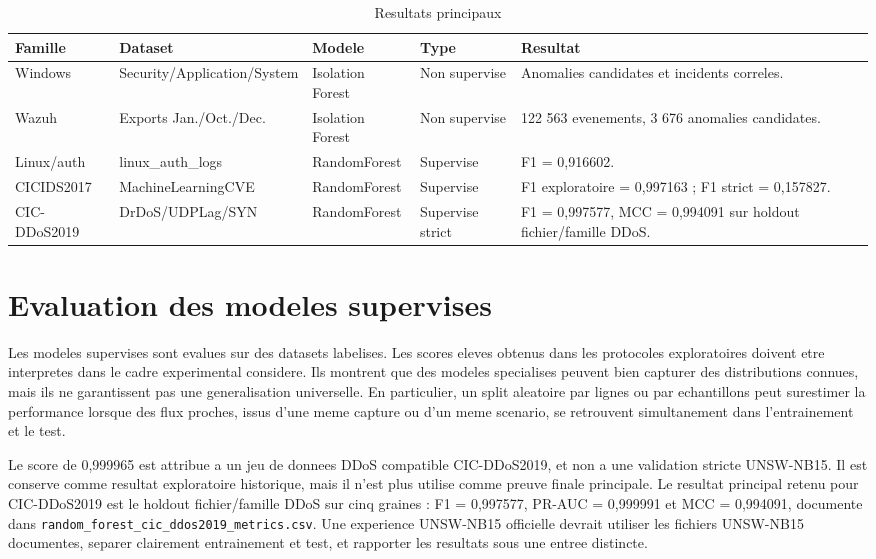 \begin{table}[H]
\centering
\caption{Resultats principaux}
\label{tab:main-results}
\scriptsize
\begin{tabularx}{\textwidth}{p{2.5cm}p{3cm}p{2.6cm}p{2.2cm}X}
\toprule
\textbf{Famille} & \textbf{Dataset} & \textbf{Modele} & \textbf{Type} & \textbf{Resultat} \\
\midrule
Windows & Security/Application/System & Isolation Forest & Non supervise & Anomalies candidates et incidents correles. \\
Wazuh & Exports Jan./Oct./Dec. & Isolation Forest & Non supervise & 122 563 evenements, 3 676 anomalies candidates. \\
Linux/auth & linux\_auth\_logs & RandomForest & Supervise & F1 = 0,916602. \\
CICIDS2017 & MachineLearningCVE & RandomForest & Supervise & F1 exploratoire = 0,997163 ; F1 strict = 0,157827. \\
CIC-DDoS2019 & DrDoS/UDPLag/SYN & RandomForest & Supervise strict & F1 = 0,997577, MCC = 0,994091 sur holdout fichier/famille DDoS. \\
\bottomrule
\end{tabularx}
\end{table}

\section{Evaluation des modeles supervises}
Les modeles supervises sont evalues sur des datasets labelises. Les scores eleves obtenus dans les protocoles exploratoires doivent etre interpretes dans le cadre experimental considere. Ils montrent que des modeles specialises peuvent bien capturer des distributions connues, mais ils ne garantissent pas une generalisation universelle. En particulier, un split aleatoire par lignes ou par echantillons peut surestimer la performance lorsque des flux proches, issus d'une meme capture ou d'un meme scenario, se retrouvent simultanement dans l'entrainement et le test.

Le score de 0,999965 est attribue a un jeu de donnees DDoS compatible CIC-DDoS2019, et non a une validation stricte UNSW-NB15. Il est conserve comme resultat exploratoire historique, mais il n'est plus utilise comme preuve finale principale. Le resultat principal retenu pour CIC-DDoS2019 est le holdout fichier/famille DDoS sur cinq graines : F1 = 0,997577, PR-AUC = 0,999991 et MCC = 0,994091, documente dans \texttt{random\_forest\_cic\_ddos2019\_metrics.csv}. Une experience UNSW-NB15 officielle devrait utiliser les fichiers UNSW-NB15 documentes, separer clairement entrainement et test, et rapporter les resultats sous une entree distincte.


